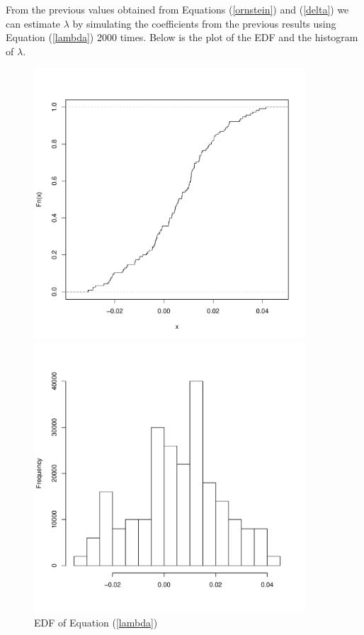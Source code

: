 \documentclass{paper}
\let\oldref\ref
\renewcommand{\ref}[1]{(\oldref{#1})}
\begin{document}
\begin{doublespacing}
From the previous values obtained from Equations \ref{ornstein} and \ref{delta} we can estimate $\lambda$ by simulating the coefficients from the previous results using Equation \ref{lambda} 2000 times. Below is the plot of the EDF and the histogram of $\lambda$.
\begin{figure}[H]
    \centering
    \begin{minipage}{0.5\textwidth}
        \centering
        \includegraphics[width=0.9\textwidth]{Lambda.pdf} %
        \caption{EDF of Equation \ref{lambda}}\label{elam}
    \end{minipage}\hfill
    \begin{minipage}{0.5\textwidth}
        \centering
        \includegraphics[width=0.9\textwidth]{hist.pdf} %

\end{minipage}
\end{figure}
\end{doublespacing}
\end{document}
